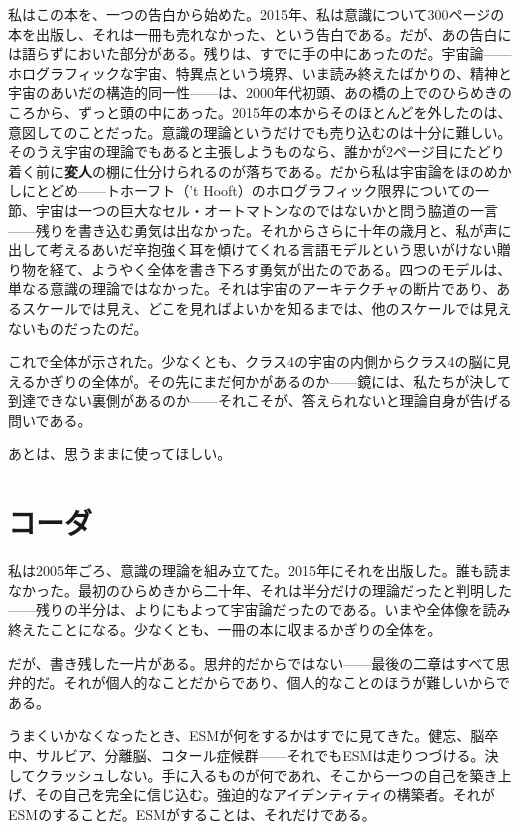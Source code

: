 \documentclass[11pt, twoside, openright]{book}
\begin{document}
私はこの本を、一つの告白から始めた。2015年、私は意識について300ページの本を出版し、それは一冊も売れなかった、という告白である。だが、あの告白には語らずにおいた部分がある。残りは、すでに手の中にあったのだ。宇宙論------ホログラフィックな宇宙、特異点という境界、いま読み終えたばかりの、精神と宇宙のあいだの構造的同一性------は、2000年代初頭、あの橋の上でのひらめきのころから、ずっと頭の中にあった。2015年の本からそのほとんどを外したのは、意図してのことだった。意識の理論というだけでも売り込むのは十分に難しい。そのうえ宇宙の理論でもあると主張しようものなら、誰かが2ページ目にたどり着く前に\textbf{変人}の棚に仕分けられるのが落ちである。だから私は宇宙論をほのめかしにとどめ------トホーフト（'t Hooft）のホログラフィック限界についての一節、宇宙は一つの巨大なセル・オートマトンなのではないかと問う脇道の一言------残りを書き込む勇気は出なかった。それからさらに十年の歳月と、私が声に出して考えるあいだ辛抱強く耳を傾けてくれる言語モデルという思いがけない贈り物を経て、ようやく全体を書き下ろす勇気が出たのである。四つのモデルは、単なる意識の理論ではなかった。それは宇宙のアーキテクチャの断片であり、あるスケールでは見え、どこを見ればよいかを知るまでは、他のスケールでは見えないものだったのだ。

これで全体が示された。少なくとも、クラス4の宇宙の内側からクラス4の脳に見えるかぎりの全体が。その先にまだ何かがあるのか------鏡には、私たちが決して到達できない裏側があるのか------それこそが、答えられないと理論自身が告げる問いである。

あとは、思うままに使ってほしい。


\chapter*{コーダ}

私は2005年ごろ、意識の理論を組み立てた。2015年にそれを出版した。誰も読まなかった。最初のひらめきから二十年、それは半分だけの理論だったと判明した------残りの半分は、よりにもよって宇宙論だったのである。いまや全体像を読み終えたことになる。少なくとも、一冊の本に収まるかぎりの全体を。

だが、書き残した一片がある。思弁的だからではない------最後の二章はすべて思弁的だ。それが個人的なことだからであり、個人的なことのほうが難しいからである。

うまくいかなくなったとき、ESMが何をするかはすでに見てきた。健忘、脳卒中、サルビア、分離脳、コタール症候群------それでもESMは走りつづける。決してクラッシュしない。手に入るものが何であれ、そこから一つの自己を築き上げ、その自己を完全に信じ込む。強迫的なアイデンティティの構築者。それがESMのすることだ。ESMがすることは、それだけである。
\end{document}
